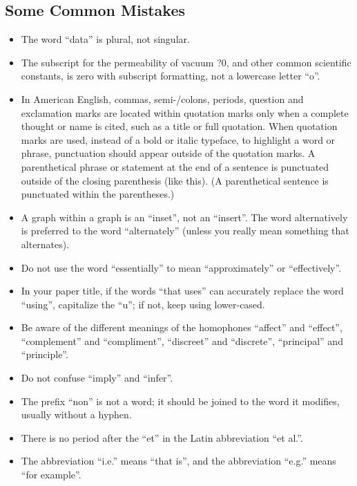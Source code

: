 \documentclass[a4paper, 10pt, conference]{ieeeconf}
\begin{document}
    \subsection{Some Common Mistakes}
    \begin{itemize}


    \item The word ``data'' is plural, not singular.
    \item The subscript for the permeability of vacuum ?0, and other common scientific constants, is zero with subscript formatting, not a lowercase letter ``o''.
    \item In American English, commas, semi-/colons, periods, question and exclamation marks are located within quotation marks only when a complete thought or name is cited, such as a title or full quotation. When quotation marks are used, instead of a bold or italic typeface, to highlight a word or phrase, punctuation should appear outside of the quotation marks. A parenthetical phrase or statement at the end of a sentence is punctuated outside of the closing parenthesis (like this). (A parenthetical sentence is punctuated within the parentheses.)
    \item A graph within a graph is an ``inset'', not an ``insert''. The word alternatively is preferred to the word ``alternately'' (unless you really mean something that alternates).
    \item Do not use the word ``essentially'' to mean ``approximately'' or ``effectively''.
    \item In your paper title, if the words ``that uses'' can accurately replace the word ``using'', capitalize the ``u''; if not, keep using lower-cased.
    \item Be aware of the different meanings of the homophones ``affect'' and ``effect'', ``complement'' and ``compliment'', ``discreet'' and ``discrete'', ``principal'' and ``principle''.
    \item Do not confuse ``imply'' and ``infer''.
    \item The prefix ``non'' is not a word; it should be joined to the word it modifies, usually without a hyphen.
    \item There is no period after the ``et'' in the Latin abbreviation ``et al.''.
    \item The abbreviation ``i.e.'' means ``that is'', and the abbreviation ``e.g.'' means ``for example''.

    \end{itemize}
\end{document}
